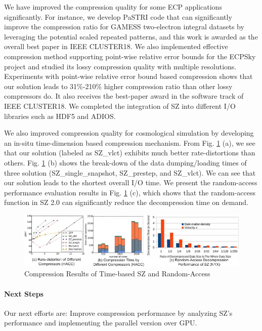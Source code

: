 We have improved the compression quality for some ECP applications significantly. For instance, we develop PaSTRI code that can significantly improve the compression ratio for GAMESS two-electron integral datasets by leveraging the potential scaled repeated patterns, and this work is awarded as the overall best paper in IEEE CLUSTER18. We also implemented effective compression method supporting point-wise relative error bounds for the ECPSky project and studied its lossy compression quality with multiple resolutions. Experiments with point-wise relative error bound based compression shows that our solution leads to 31\%-210\% higher compression ratio than other lossy compressors do. It also receives the best-paper award in the software track of IEEE CLUSTER18. We completed the integration of SZ into different I/O libraries such as HDF5 and ADIOS. 

We also improved compression quality for cosmological simulation by developing an in-situ time-dimension based compression mechanism. From Fig. \ref{fig:szcompression} (a), we see that our solution (labeled as SZ\_vlct) exhibits much better rate-distortions than others. Fig. \ref{fig:szcompression} (b) shows the break-down of the data dumping/loading times of three solution (SZ\_single\_snapshot, SZ\_prestep, and SZ\_vlct). We can see that our solution leads to the shortest overall I/O time. We present the random-access performance evaluation results in Fig. \ref{fig:szcompression} (c), which shows that the random-access function in SZ 2.0 can significantly reduce the decompression time on demand. 

\begin{figure}[htb]
\centering
\includegraphics[width=6in]{projects/2.3.4-DataViz/2.3.4.14-VeloC-SZ/time-based-comp-and-random.jpg}
\vspace{-2mm}
\caption{Compression Results of Time-based SZ and Random-Access}
\label{fig:szcompression}
\vspace{-5mm}
\end{figure}

\paragraph{Next Steps} Our next efforts are: Improve compression performance by analyzing SZ's performance and implementing the parallel version over GPU.

